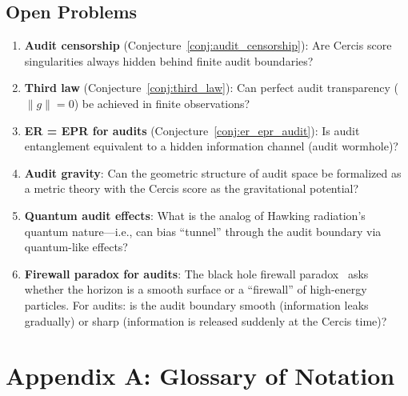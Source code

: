 \documentclass[12pt,a4paper]{article}
\theoremstyle{remark}
\newcommand{\Cercis}{\textsf{Cercis}}
\begin{document}
\subsection{Open Problems}

\begin{enumerate}[leftmargin=*, label=(\arabic*)]
  \item \textbf{Audit censorship} (Conjecture~\ref{conj:audit_censorship}): Are \Cercis{} score singularities always hidden behind finite audit boundaries?
  \item \textbf{Third law} (Conjecture~\ref{conj:third_law}): Can perfect audit transparency ($\|g\| = 0$) be achieved in finite observations?
  \item \textbf{ER = EPR for audits} (Conjecture~\ref{conj:er_epr_audit}): Is audit entanglement equivalent to a hidden information channel (audit wormhole)?
  \item \textbf{Audit gravity}: Can the geometric structure of audit space be formalized as a metric theory with the \Cercis{} score as the gravitational potential?
  \item \textbf{Quantum audit effects}: What is the analog of Hawking radiation's quantum nature---i.e., can bias ``tunnel'' through the audit boundary via quantum-like effects?
  \item \textbf{Firewall paradox for audits}: The black hole firewall paradox~\cite{almheiri2013black} asks whether the horizon is a smooth surface or a ``firewall'' of high-energy particles. For audits: is the audit boundary smooth (information leaks gradually) or sharp (information is released suddenly at the Cercis time)?
\end{enumerate}


\section*{Appendix A: Glossary of Notation}
\label{app:notation}
\end{document}
